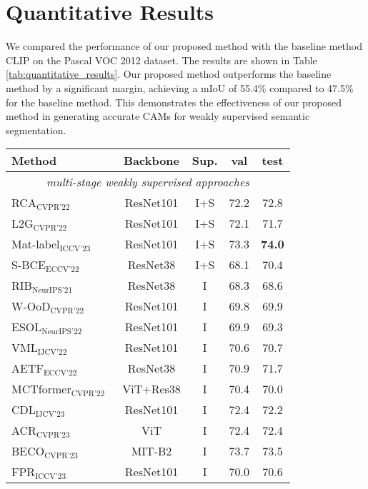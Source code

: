 
\section{Quantitative Results}
\label{subsec: Quantitative Results}
We compared the performance of our proposed method with the baseline method CLIP \cite{wsss_frozen_clip} on the Pascal VOC 2012 dataset. The results are shown in Table \ref{tab:quantitative_results}. Our proposed method outperforms the baseline method by a significant margin, achieving a mIoU of 55.4\% compared to 47.5\% for the baseline method. This demonstrates the effectiveness of our proposed method in generating accurate CAMs for weakly supervised semantic segmentation.

\begin{table}[ht]
\centering
\renewcommand{\arraystretch}{1.2}
\setlength{\tabcolsep}{6pt}
\begin{tabular}{l c c c c}
\hline
Method & Backbone & Sup. & val & test \\
\hline
\multicolumn{5}{c}{\textit{multi-stage weakly supervised approaches}} \\
RCA$_{\text{CVPR'22}}$~\cite{64} & ResNet101 & I+S & 72.2 & 72.8 \\
L2G$_{\text{CVPR'22}}$~\cite{19} & ResNet101 & I+S & 72.1 & 71.7 \\
Mat-label$_{\text{ICCV'23}}$~\cite{45} & ResNet101 & I+S & 73.3 & \textbf{74.0} \\
S-BCE$_{\text{ECCV'22}}$~\cite{49} & ResNet38 & I+S & 68.1 & 70.4 \\
RIB$_{\text{NeurIPS'21}}$~\cite{23} & ResNet38 & I & 68.3 & 68.6 \\
W-OoD$_{\text{CVPR'22}}$~\cite{24} & ResNet101 & I & 69.8 & 69.9 \\
ESOL$_{\text{NeurIPS'22}}$~\cite{25} & ResNet101 & I & 69.9 & 69.3 \\
VML$_{\text{IJCV'22}}$~\cite{38} & ResNet101 & I & 70.6 & 70.7 \\
AETF$_{\text{ECCV'22}}$~\cite{54} & ResNet38 & I & 70.9 & 71.7 \\
MCTformer$_{\text{CVPR'22}}$~\cite{52} & ViT+Res38 & I & 70.4 & 70.0 \\
CDL$_{\text{IJCV'23}}$~\cite{58} & ResNet101 & I & 72.4 & 72.2 \\
ACR$_{\text{CVPR'23}}$~\cite{22} & ViT & I & 72.4 & 72.4 \\
BECO$_{\text{CVPR'23}}$~\cite{37} & MIT-B2 & I & 73.7 & 73.5 \\
FPR$_{\text{ICCV'23}}$~\cite{5} & ResNet101 & I & 70.0 & 70.6 \\

\end{tabular}
\end{table}
